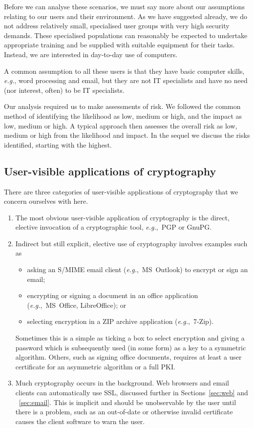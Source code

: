 \documentclass{article}
\newcommand{\eg}{\textit{e.g.}}
\begin{document}
Before we can analyse these scenarios, 
we must say more about our assumptions relating to our users
and their environment.
As we have suggested already, we do not address relatively small,
specialised user groups with very high security demands.  These
specialised populations can reasonably be expected to undertake
appropriate training and be supplied with suitable equipment for their
tasks.  Instead, we are interested in day-to-day use of computers.

A common assumption to all these users is that they have basic
computer skills, \eg, word processing and email, but they are not IT
specialists and have no need (nor interest, often) to be IT
specialists.

Our analysis required us to make assessments of risk.  We followed the
common method of identifying the likelihood as low, medium or high,
and the impact as low, medium or high.  A typical approach then
assesses the overall risk as low, medium or high from the likelihood
and impact.  In the sequel we discuss the risks identified, starting
with the highest.

\subsection{User-visible applications of cryptography}\label{sec:categories}

There are three categories of user-visible applications of cryptography that we concern ourselves with here.

\begin{enumerate}
\item\label{item:direct} The most obvious user-visible application of cryptography is the
  direct, elective invocation of a cryptographic tool, \eg,~PGP or
  GnuPG.

\item\label{item:indirect}  Indirect but still explicit, elective use of cryptography
  involves examples such as
  \begin{itemize}
  \item asking an S/MIME email client (\eg,~MS~Outlook) to encrypt or
    sign an email;
  \item encrypting or signing a document in an office application
    (\eg,~MS~Office, LibreOffice); or
  \item selecting encryption in a ZIP archive application
    (\eg,~7-Zip).
  \end{itemize}
  Sometimes this is a simple as ticking a box to select encryption and
  giving a password which is subsequently used (in some form) as a key
  to a symmetric algorithm.  Others, such as signing office documents,
  requires at least a user certificate for an asymmetric algorithm or
  a full PKI.


\item  Much cryptography occurs in the background.  Web browsers and email
  clients can automatically use SSL, discussed further in
  Sections~\ref{sec:web} and ~\ref{sec:email}.  This is implicit and
  should be unobservable by the user until there is a problem, such as
  an out-of-date or otherwise invalid certificate causes the client
  software to warn the user.
\end{enumerate}
\end{document}
